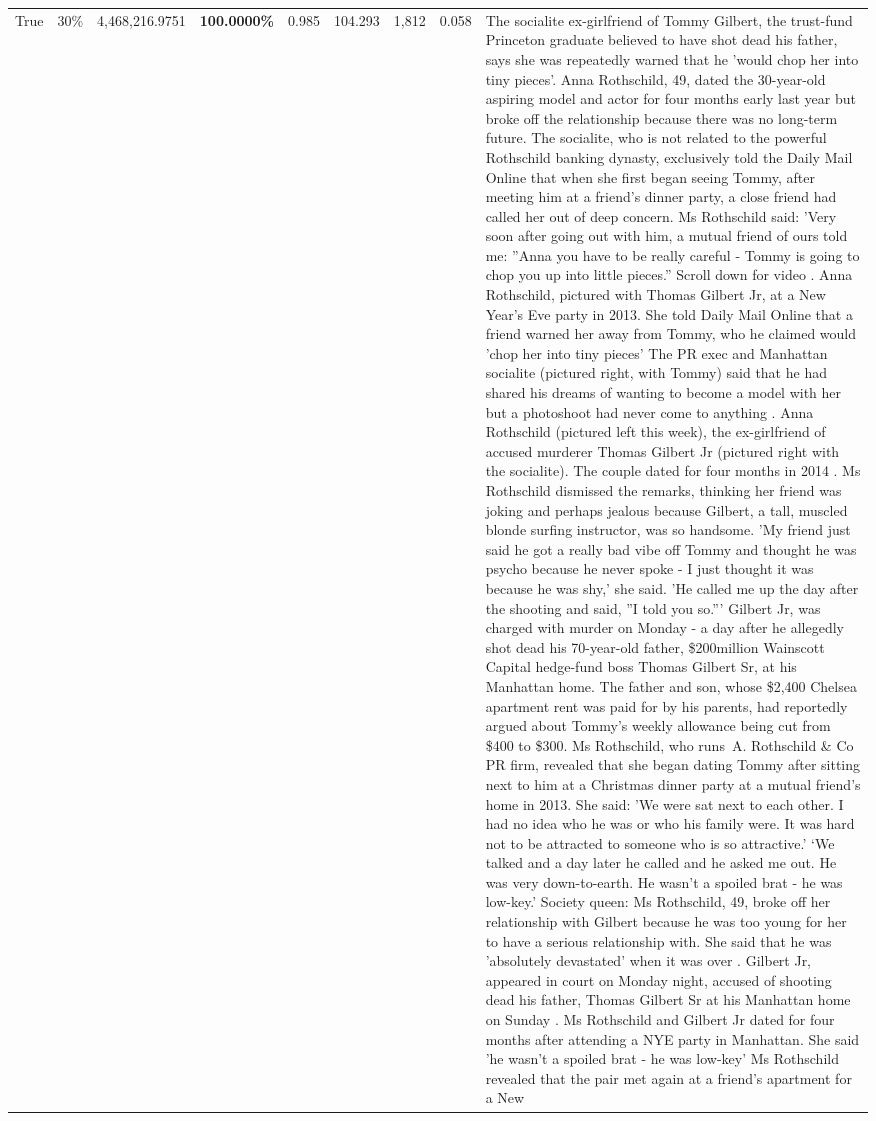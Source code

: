 \begin{table}[H]
\begin{tabular}{lllrlllll}
True & 30\% & 4,468,216.9751 & \bfseries \color{red} 100.0000\% & 0.985 & 104.293 & 1,812 & 0.058 & The socialite ex-girlfriend of Tommy Gilbert, the trust-fund Princeton graduate believed to have shot dead his father, says she was repeatedly warned that he 'would chop her into tiny pieces'. Anna Rothschild, 49, dated the 30-year-old aspiring model and actor for four months early last year but broke off the relationship because there was no long-term future. The socialite, who is not related to the powerful Rothschild banking dynasty, exclusively told the Daily Mail Online that when she first began seeing Tommy, after meeting him at a friend's dinner party, a close friend had called her out of deep concern. Ms Rothschild said: 'Very soon after going out with him, a mutual friend of ours told me: ''Anna you have to be really careful - Tommy is going to chop you up into little pieces.'' Scroll down for video . Anna Rothschild, pictured with Thomas Gilbert Jr, at a New Year's Eve party in 2013. She told Daily Mail Online that a friend warned her away from Tommy, who he claimed would 'chop her into tiny pieces' The PR exec and Manhattan socialite (pictured right, with Tommy) said that he had shared his dreams of wanting to become a model with her but a photoshoot had never come to anything . Anna Rothschild (pictured left this week), the ex-girlfriend of accused murderer Thomas Gilbert Jr (pictured right with the socialite). The couple dated for four months in 2014 . Ms Rothschild dismissed the remarks, thinking her friend was joking and perhaps jealous because Gilbert, a tall, muscled blonde surfing instructor, was so handsome. 'My friend just said he got a really bad vibe off Tommy and thought he was psycho because he never spoke - I just thought it was because he was shy,' she said. 'He called me up the day after the shooting and said, ''I told you so.''' Gilbert Jr, was charged with murder on Monday - a day after he allegedly shot dead his 70-year-old father, \$200million Wainscott Capital hedge-fund boss Thomas Gilbert Sr, at his Manhattan home. The father and son, whose \$2,400 Chelsea apartment rent was paid for by his parents, had reportedly argued about Tommy's weekly allowance being cut from \$400 to \$300. Ms Rothschild, who runs A. Rothschild \& Co PR firm, revealed that she began dating Tommy after sitting next to him at a Christmas dinner party at a mutual friend's home in 2013. She said: 'We were sat next to each other. I had no idea who he was or who his family were. It was hard not to be attracted to someone who is so attractive.' ‘We talked and a day later he called and he asked me out. He was very down-to-earth. He wasn’t a spoiled brat - he was low-key.’ Society queen: Ms Rothschild, 49, broke off her relationship with Gilbert because he was too young for her to have a serious relationship with. She said that he was 'absolutely devastated' when it was over . Gilbert Jr, appeared in court on Monday night, accused of shooting dead his father, Thomas Gilbert Sr at his Manhattan home on Sunday . Ms Rothschild and Gilbert Jr dated for four months after attending a NYE party in Manhattan. She said 'he wasn't a spoiled brat - he was low-key' Ms Rothschild revealed that the pair met again at a friend’s apartment for a New 
\end{tabular}
\end{table}

